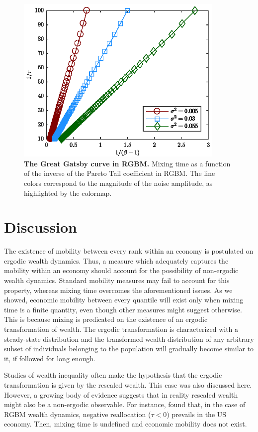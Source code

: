 \documentclass[11pt]{article}
\numberwithin{equation}{section}
\begin{document}
\begin{figure}[!htb]
\centering
\includegraphics[width=10cm]{figs/fig_great_gatsby.eps}
\caption{\textbf{The Great Gatsby curve in RGBM.} Mixing time as a function of the inverse of the Pareto Tail coefficient in RGBM. The line colors correspond to the magnitude of the noise amplitude, as highlighted by the colormap.
\label{fig:rgbm-great-gatsby}}
\end{figure}

\FloatBarrier

\section{Discussion} \label{sec:discussion}

The existence of mobility between every rank within an economy is postulated on ergodic wealth dynamics. Thus, a measure which adequately captures the mobility within an economy should account for the possibility of non-ergodic wealth dynamics. Standard mobility measures may fail to account for this property, whereas mixing time overcomes the aforementioned issues. As we showed, economic mobility between every quantile will exist only when mixing time is a finite quantity, even though other measures might suggest otherwise. This is because mixing is predicated on the existence of an ergodic transformation of wealth. The ergodic transformation is characterized with a steady-state distribution and the transformed wealth distribution of any arbitrary subset of individuals belonging to the population will gradually become similar to it, if followed for long enough.

Studies of wealth inequality often make the hypothesis that the ergodic transformation is given by the rescaled wealth. This case was also discussed here. However, a growing body of evidence suggests that in reality rescaled wealth might also be a non-ergodic observable. For instance, \citet{BermanPetersAdamou2019} found that, in the case of RGBM wealth dynamics, negative reallocation ($\tau < 0$) prevails in the US economy. Then, mixing time is undefined and economic mobility does not exist.
 
\end{document}
